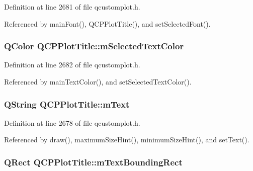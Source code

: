 Definition at line 2681 of file qcustomplot.\+h.



Referenced by main\+Font(), Q\+C\+P\+Plot\+Title(), and set\+Selected\+Font().

\hypertarget{class_q_c_p_plot_title_a8b9760e62af92814c4effdd7ad69c5f9}{}
\subsubsection[{m\+Selected\+Text\+Color}]{\setlength{\rightskip}{0pt plus 5cm}Q\+Color Q\+C\+P\+Plot\+Title\+::m\+Selected\+Text\+Color\hspace{0.3cm}{\ttfamily [protected]}}\label{class_q_c_p_plot_title_a8b9760e62af92814c4effdd7ad69c5f9}


Definition at line 2682 of file qcustomplot.\+h.



Referenced by main\+Text\+Color(), and set\+Selected\+Text\+Color().

\hypertarget{class_q_c_p_plot_title_a0d961bfac1211d59d3b0bc30d35f6379}{}
\subsubsection[{m\+Text}]{\setlength{\rightskip}{0pt plus 5cm}Q\+String Q\+C\+P\+Plot\+Title\+::m\+Text\hspace{0.3cm}{\ttfamily [protected]}}\label{class_q_c_p_plot_title_a0d961bfac1211d59d3b0bc30d35f6379}


Definition at line 2678 of file qcustomplot.\+h.



Referenced by draw(), maximum\+Size\+Hint(), minimum\+Size\+Hint(), and set\+Text().

\hypertarget{class_q_c_p_plot_title_a7178a0f6c1e633c144c17b4de4e0b840}{}
\subsubsection[{m\+Text\+Bounding\+Rect}]{\setlength{\rightskip}{0pt plus 5cm}Q\+Rect Q\+C\+P\+Plot\+Title\+::m\+Text\+Bounding\+Rect\hspace{0.3cm}{\ttfamily [protected]}}\label{class_q_c_p_plot_title_a7178a0f6c1e633c144c17b4de4e0b840}


